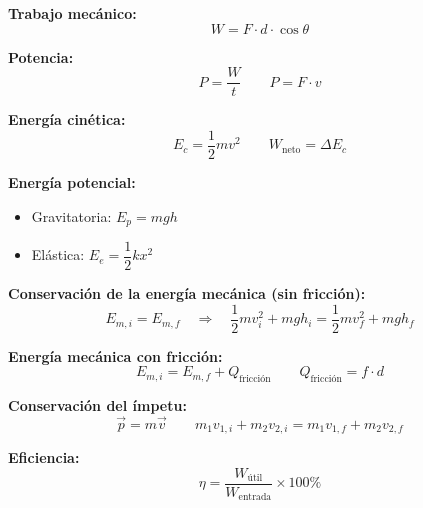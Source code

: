 \begin{nota}
\textbf{Trabajo mecánico:}
$$W = F \cdot d \cdot \cos\theta$$

\vspace{0.3cm}

\textbf{Potencia:}
$$P = \frac{W}{t} \qquad P = F \cdot v$$

\vspace{0.3cm}

\textbf{Energía cinética:}
$$E_c = \frac{1}{2}mv^2 \qquad W_{\text{neto}} = \Delta E_c$$

\vspace{0.3cm}

\textbf{Energía potencial:}
\begin{itemize}
    \item Gravitatoria: $E_p = mgh$
    \item Elástica: $E_e = \dfrac{1}{2}kx^2$
\end{itemize}

\vspace{0.3cm}

\textbf{Conservación de la energía mecánica (sin fricción):}
$$E_{m,i} = E_{m,f} \quad \Rightarrow \quad \frac{1}{2}mv_i^2 + mgh_i = \frac{1}{2}mv_f^2 + mgh_f$$

\vspace{0.3cm}

\textbf{Energía mecánica con fricción:}
$$E_{m,i} = E_{m,f} + Q_{\text{fricción}} \qquad Q_{\text{fricción}} = f \cdot d$$

\vspace{0.3cm}

\textbf{Conservación del ímpetu:}
$$\vec{p} = m\vec{v} \qquad m_1v_{1,i} + m_2v_{2,i} = m_1v_{1,f} + m_2v_{2,f}$$

\vspace{0.3cm}

\textbf{Eficiencia:}
$$\eta = \frac{W_{\text{útil}}}{W_{\text{entrada}}} \times 100\%$$
\end{nota}
